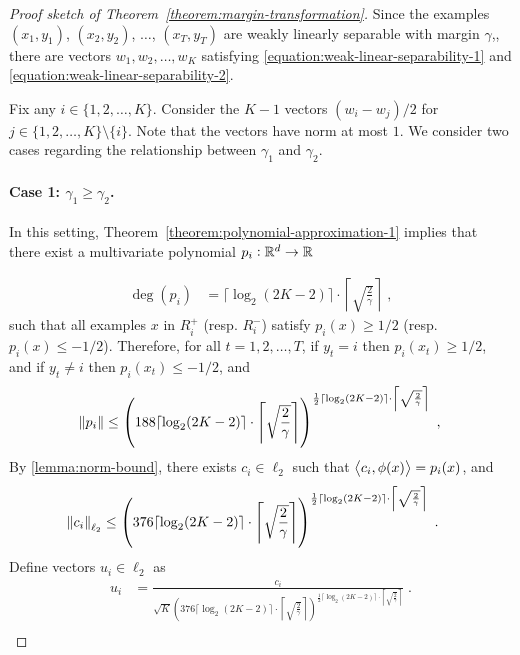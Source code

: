 \begin{proof}[Proof sketch of Theorem~\ref{theorem:margin-transformation}]
Since the examples $(x_1, y_1)$, $(x_2, y_2)$, $\dots$, $(x_T, y_T)$ are weakly
linearly separable with margin $\gamma$,, there are vectors $w_1, w_2, \dots, w_K$
satisfying \eqref{equation:weak-linear-separability-1} and
\eqref{equation:weak-linear-separability-2}.

Fix any $i \in \{1,2,\dots,K\}$. Consider the $K-1$ vectors $(w_i - w_j)/2$ for
$j \in \{1,2,\dots,K\} \setminus \{i\}$. Note that the vectors have norm at most
$1$. We consider two cases regarding the relationship between $\gamma_1$ and
$\gamma_2$.

\paragraph{Case 1: $\gamma_1 \geq \gamma_2$.} In this setting, Theorem~\ref{theorem:polynomial-approximation-1}
implies that there exist a multivariate polynomial $p_i:\mathbb{R}^d \to \mathbb{R}$

\begin{align*}
\deg(p_i) & = \lceil \log_2(2K-2) \rceil \cdot \left\lceil \sqrt{\frac{2}{\gamma}} \right\rceil \; ,
\end{align*}
such that all examples $x$ in $R_i^+$ (resp. $R_i^-$) satisfy $p_i(x) \geq 1/2$
(resp. $p_i(x) \leq -1/2$).
Therefore, for all $t=1,2,\dots,T$, if $y_t = i$ then $p_i(x_t) \ge 1/2$,
 and if $y_t \neq i$ then $p_i(x_t) \le -1/2$, and
\begin{align*}
\norm{p_i} & \le \left(188 \lceil \log_2(2K-2) \rceil \cdot \left \lceil \sqrt{\frac{2}{\gamma}} \right \rceil \right)^{\frac{1}{2} \lceil \log_2(2K-2) \rceil
\cdot \left \lceil \sqrt{\frac{2}{\gamma}} \right \rceil} \; , \\
\end{align*}
By \autoref{lemma:norm-bound}, there exists $c_i \in \ell_2$ such that
$\left\langle c_i, \phi(x) \right\rangle = p_i(x)$, and
\begin{align*}
\norm{c_i}_{\ell_2}
& \le \left(376 \lceil \log_2(2K-2) \rceil \cdot \left \lceil \sqrt{\frac{2}{\gamma}} \right \rceil \right)^{\frac{1}{2} \lceil \log_2(2K-2) \rceil
\cdot \left \lceil \sqrt{\frac{2}{\gamma}} \right \rceil} \; .
\end{align*}
Define vectors $u_i \in \ell_2$ as
\begin{align*}
u_i & = \frac{c_i}{\sqrt{K} \left(376 \lceil \log_2(2K-2) \rceil \cdot \left \lceil \sqrt{\frac{2}{\gamma}} \right \rceil \right)^{\frac{1}{2} \lceil \log_2(2K-2) \rceil
\cdot \left \lceil \sqrt{\frac{2}{\gamma}} \right \rceil}} \; . \\
\end{align*}


\end{proof}
